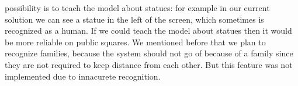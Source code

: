 possibility is to teach the model about statues: for example in our current solution we can see a statue in the left of the screen, which sometimes is recognized as a human. If we could teach the model about statues then it would be more reliable on public squares. We mentioned before that we plan to recognize families, because the system should not
go of because of a family since they are not required to keep distance from each other. But this feature was not implemented due to innacurete recognition.